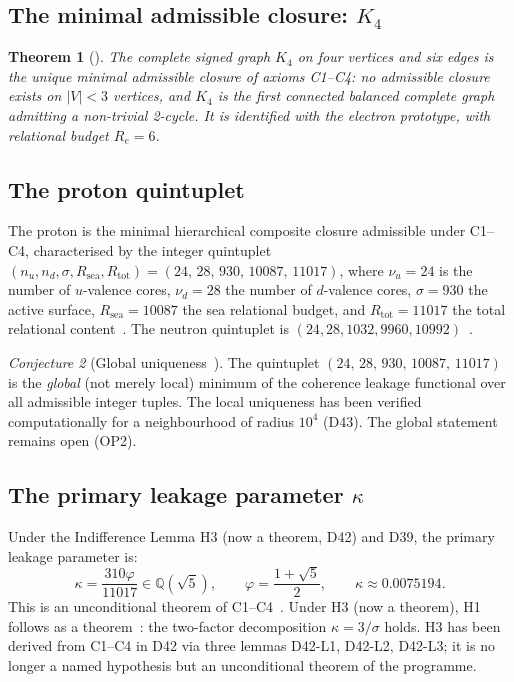 \documentclass[11pt,a4paper]{article}
\theoremstyle{plain}
\newtheorem{theorem}{Theorem}[section]
\theoremstyle{definition}
\theoremstyle{remark}
\newtheorem{conjecture}[theorem]{Conjecture}
\newcommand{\quintuplet}{(24,\,28,\,930,\,10087,\,11017)}
\begin{document}
\subsection{The minimal admissible closure: \texorpdfstring{$K_4$}{K4}}
\label{subsec:K4}
\begin{theorem}[\cite{D16a}]
\label{thm:K4}
The complete signed graph $K_4$ on four vertices and six edges is the unique minimal admissible closure of axioms C1--C4: no admissible closure exists on $|V|<3$ vertices, and $K_4$ is the first connected balanced complete graph admitting a non-trivial 2-cycle. It is identified with the electron prototype, with relational budget $R_e=6$.
\end{theorem}

\subsection{The proton quintuplet}
\label{subsec:quintuplet}
The proton is the minimal hierarchical composite closure admissible under C1--C4, characterised by the integer quintuplet $(n_u, n_d, \sigma, R_{\mathrm{sea}}, R_{\mathrm{tot}}) = \quintuplet$, where $\nu_u=24$ is the number of $u$-valence cores, $\nu_d=28$ the number of $d$-valence cores, $\sigma=930$ the active surface, $R_{\mathrm{sea}}=10087$ the sea relational budget, and $R_{\mathrm{tot}}=11017$ the total relational content~\cite{D01,D16,D16a,D16b}. The neutron quintuplet is $(24,28,1032,9960,10992)$~\cite{D22}.

\begin{conjecture}[Global uniqueness~\cite{D16,D16b}]
\label{conj:uniqueness}
The quintuplet $\quintuplet$ is the \emph{global} (not merely local) minimum of the coherence leakage functional over all admissible integer tuples. The local uniqueness has been verified computationally for a neighbourhood of radius $10^4$ (D43). The global statement remains open (OP2).
\end{conjecture}

\subsection{The primary leakage parameter \texorpdfstring{$\kappa$}{kappa}}
\label{subsec:kappa}
Under the Indifference Lemma H3 (now a theorem, D42) and D39, the primary leakage parameter is:
\begin{equation}
\kappa = \frac{310\varphi}{11017} \in \mathbb{Q}(\sqrt{5}), \qquad \varphi = \frac{1+\sqrt{5}}{2}, \qquad \kappa \approx 0.0075194.
\end{equation}
This is an unconditional theorem of C1--C4~\cite{D39,D42}. Under H3 (now a theorem), H1 follows as a theorem~\cite{D39}: the two-factor decomposition $\kappa=3/\sigma$ holds. H3 has been derived from C1--C4 in D42 via three lemmas D42-L1, D42-L2, D42-L3; it is no longer a named hypothesis but an unconditional theorem of the programme.
\end{document}

